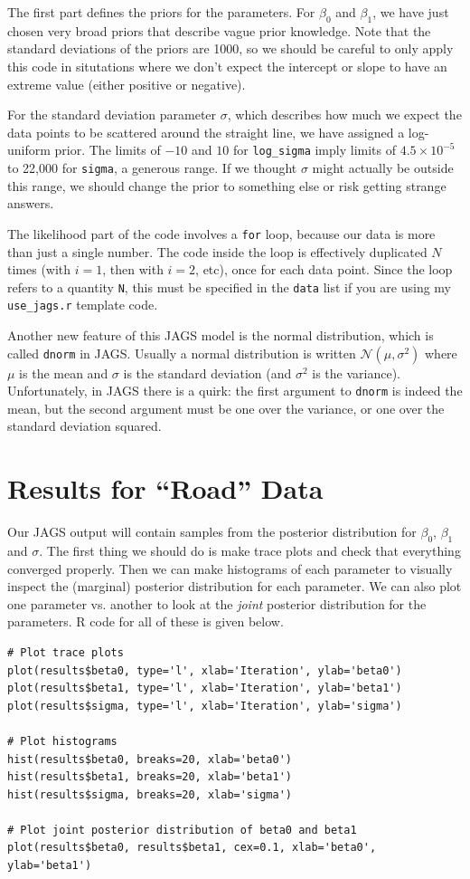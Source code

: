 The first part defines the priors for the parameters. For $\beta_0$ and $\beta_1$,
we have just chosen very broad priors that describe vague prior knowledge. Note
that the standard deviations of the priors are 1000, so we should be careful
to only apply this code in situtations where we don't expect the intercept or
slope to have an extreme value (either positive or negative).

For the standard deviation parameter $\sigma$, which describes how much we
expect the data points to be scattered around the straight line, we have assigned
a log-uniform prior. The limits of $-10$ and $10$ for {\tt log\_sigma} imply
limits of $4.5 \times 10^{-5}$ to 22,000 for {\tt sigma}, a generous range.
If we thought $\sigma$
might actually be outside this range, we should change the prior to something
else or risk getting strange answers.

The likelihood part of the code involves a {\tt for} loop, because our data
is more than just a single number. The code inside the loop is effectively
duplicated $N$ times (with $i=1$, then with $i=2$, etc), once for each data
point. Since the loop refers to a quantity {\tt N}, this must be specified in
the {\tt data} list if you are using my {\tt use\_jags.r} template code.

Another new feature of this JAGS model is the normal distribution, which is
called {\tt dnorm} in JAGS. Usually a normal distribution is written
$\mathcal{N}(\mu, \sigma^2)$ where $\mu$ is the mean and $\sigma$ is the standard
deviation (and $\sigma^2$ is the variance). Unfortunately, in JAGS there is a
quirk: the first argument to {\tt dnorm} is indeed the mean, but the second argument
must be one over the variance, or one over the standard deviation squared.

\section{Results for ``Road'' Data}
Our JAGS output will contain samples from the posterior distribution for
$\beta_0$, $\beta_1$ and $\sigma$. The first thing we should do is make
trace plots and check that everything converged properly. Then we can make
histograms of each parameter to visually inspect the (marginal) posterior
distribution for each parameter. We can also plot one parameter vs. another
to look at the {\it joint} posterior distribution for the parameters. R code
for all of these is given below.

\begin{framed}
\begin{verbatim}
# Plot trace plots
plot(results$beta0, type='l', xlab='Iteration', ylab='beta0')
plot(results$beta1, type='l', xlab='Iteration', ylab='beta1')
plot(results$sigma, type='l', xlab='Iteration', ylab='sigma')

# Plot histograms
hist(results$beta0, breaks=20, xlab='beta0')
hist(results$beta1, breaks=20, xlab='beta1')
hist(results$sigma, breaks=20, xlab='sigma')

# Plot joint posterior distribution of beta0 and beta1
plot(results$beta0, results$beta1, cex=0.1, xlab='beta0', ylab='beta1')
\end{verbatim}
\end{framed}

